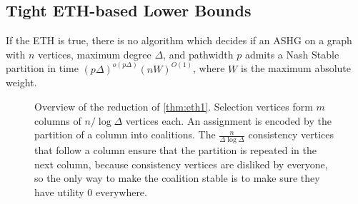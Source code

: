 \documentclass[letterpaper,USenglish,cleveref, autoref, thm-restate]{lipics-v2021}
\begin{document}
\subsection{Tight ETH-based Lower Bounds}\label{sec:twdhard}



\begin{theorem}\label{thm:eth1} If the ETH is true, there is no algorithm which
decides if an ASHG on a graph with $n$ vertices, maximum degree $\Delta$, and
pathwidth $p$ admits a Nash Stable partition in time
$(p\Delta)^{o(p\Delta)}(nW)^{O(1)}$, where $W$ is the maximum absolute weight.
\end{theorem}

\begin{figure}
 \caption{Overview of the reduction of \cref{thm:eth1}.
Selection vertices form $m$ columns of $n/\log\Delta$ vertices each. An
assignment is encoded by the partition of a column into coalitions. The
$\frac{n}{\Delta\log\Delta}$ consistency vertices that follow a column ensure
that the partition is repeated in the next column, because consistency vertices
are disliked by everyone, so the only way to make the coalition stable is to
make sure they have utility $0$ everywhere. }\label{fig1} \end{figure}
\end{document}
